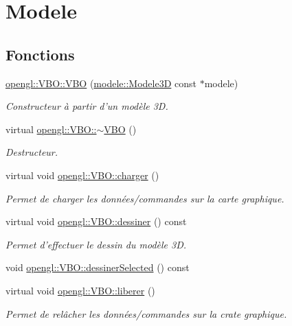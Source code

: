 \hypertarget{group__modele}{\section{Modele}
\label{group__modele}
}
\subsection*{Fonctions}
\begin{DoxyCompactItemize}
\item 
\hyperlink{group__modele_ga6fa9de06cf295f987e2022162f1c0d41}{opengl\-::\-V\-B\-O\-::\-V\-B\-O} (\hyperlink{classmodele_1_1_modele3_d}{modele\-::\-Modele3\-D} const $\ast$modele)
\begin{DoxyCompactList}\small\item\em Constructeur à partir d'un modèle 3\-D. \end{DoxyCompactList}\item 
virtual \hyperlink{group__modele_gafcea85cfc425d9c4720a32a53b720783}{opengl\-::\-V\-B\-O\-::$\sim$\-V\-B\-O} ()
\begin{DoxyCompactList}\small\item\em Destructeur. \end{DoxyCompactList}\item 
virtual void \hyperlink{group__modele_gacecd4cf0a91c2b8b34c193f7801d42ea}{opengl\-::\-V\-B\-O\-::charger} ()
\begin{DoxyCompactList}\small\item\em Permet de charger les données/commandes sur la carte graphique. \end{DoxyCompactList}\item 
virtual void \hyperlink{group__modele_ga41350c248ef222b9cbfb850432abbc53}{opengl\-::\-V\-B\-O\-::dessiner} () const 
\begin{DoxyCompactList}\small\item\em Permet d'effectuer le dessin du modèle 3\-D. \end{DoxyCompactList}\item 
void \hyperlink{group__modele_ga17f25b54d1a61772cf3a3f88a3ce6274}{opengl\-::\-V\-B\-O\-::dessiner\-Selected} () const 
\item 
virtual void \hyperlink{group__modele_ga6fd3c8634c2da6d9460aa5d118ac47cd}{opengl\-::\-V\-B\-O\-::liberer} ()
\begin{DoxyCompactList}\small\item\em Permet de relâcher les données/commandes sur la crate graphique. \end{DoxyCompactList}\end{DoxyCompactItemize}


